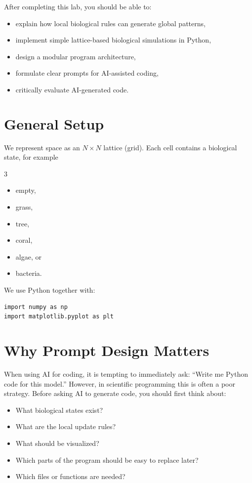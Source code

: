 \documentclass[paper=letter, fontsize=12pt]{article}
\numberwithin{equation}{section}
\begin{document}
After completing this lab, you should be able to:
\begin{itemize}
\item explain how local biological rules can generate global patterns,
\item implement simple lattice-based biological simulations in Python,
\item design a modular program architecture,
\item formulate clear prompts for AI-assisted coding,
\item critically evaluate AI-generated code.
\end{itemize}

\section*{General Setup}
We represent space as an $N \times N$ lattice (grid). Each cell contains a biological state, for example
\begin{multicols}{3}
\begin{itemize}
\item empty,
\item grass,
\item tree,
\item coral,
\item algae, or
\item bacteria.
\end{itemize}
\end{multicols}

We use Python together with:
\begin{lstlisting}
import numpy as np
import matplotlib.pyplot as plt
\end{lstlisting}

\section*{Why Prompt Design Matters}
When using AI for coding, it is tempting to immediately ask: ``Write me Python code for this model.'' However, in scientific programming this is often a poor strategy. Before asking AI to generate code, you should first think about:
\begin{itemize}
\item What biological states exist?
\item What are the local update rules?
\item What should be visualized?
\item Which parts of the program should be easy to replace later?
\item Which files or functions are needed?
\end{itemize}
\end{document}
